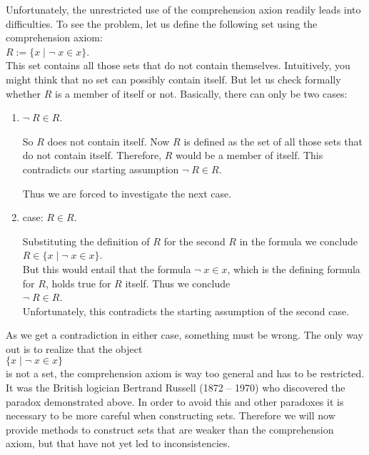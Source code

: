 Unfortunately, the unrestricted use of the comprehension axion readily leads into difficulties.
To see the problem, let us define the following set using the comprehension axiom:
 \\[0.2cm]
\hspace*{1.3cm} 
$R := \{ x \;|\; \neg\; x \in x \}$.  
\\[0.2cm]
This set contains all those sets that do not contain themselves.
Intuitively, you might think that no set can possibly contain itself.
But let us check formally whether $R$ is a member of itself or not.
Basically, there can only be two cases:
\begin{enumerate}
\item $\neg\; R \in R$. 

      So $R$ does not contain itself.
      Now $R$ is defined as the set of all those sets that do not contain itself.
      Therefore, $R$ would be a member of itself.  This contradicts our starting assumption
      $\neg\; R \in R$.
      
      Thus we are forced to investigate the next case.
\item case: $R \in R$. 

      Substituting the definition of $R$ for the second $R$ in the formula we conclude \\[0.2cm]
      \hspace*{1.3cm}  
      $R \in \{ x \;|\; \neg\; x \in x \}$. 
      \\[0.2cm]
      But this would entail that the formula $\neg\; x \in x$, which is the defining
      formula for $R$, holds true for $R$ itself.  Thus we conclude
      \\[0.2cm]
      \hspace*{1.3cm}
      $\neg\; R \in R$.
      \\[0.2cm]
      Unfortunately, this contradicts the starting assumption of the second case.
\end{enumerate}
As we get a contradiction in either case, something must be wrong.  The only way out is to
realize that the object 
\\[0.2cm]
\hspace*{1.3cm} $\{ x \mid \neg\; x \in x \}$ \\[0.2cm]
is not a set, the comprehension axiom is way too general and has to be restricted.
It was the British logician Bertrand Russell (1872 -- 1970) who discovered the paradox
demonstrated above.  
In order to avoid this and other paradoxes it is necessary to be more careful when
constructing sets.  Therefore we will now provide methods to construct sets that are
weaker than the comprehension axiom, but that have not yet led to inconsistencies.


